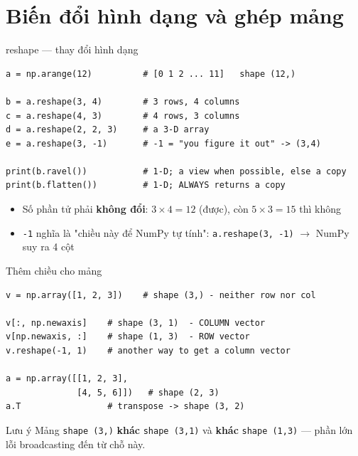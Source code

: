 \documentclass[11pt]{beamer}
\begin{document}
\section{Biến đổi hình dạng và ghép mảng}

\begin{frame}[fragile]{reshape --- thay đổi hình dạng}
\begin{lstlisting}
a = np.arange(12)          # [0 1 2 ... 11]   shape (12,)

b = a.reshape(3, 4)        # 3 rows, 4 columns
c = a.reshape(4, 3)        # 4 rows, 3 columns
d = a.reshape(2, 2, 3)     # a 3-D array
e = a.reshape(3, -1)       # -1 = "you figure it out" -> (3,4)

print(b.ravel())           # 1-D; a view when possible, else a copy
print(b.flatten())         # 1-D; ALWAYS returns a copy
\end{lstlisting}
\begin{itemize}
  \item Số phần tử phải \textbf{không đổi}: $3 \times 4 = 12$ (được), còn $5 \times 3 = 15$ thì không
  \item \texttt{-1} nghĩa là "chiều này để NumPy tự tính": \texttt{a.reshape(3, -1)} $\to$ NumPy suy ra 4 cột
\end{itemize}
\end{frame}

\begin{frame}[fragile]{Thêm chiều cho mảng}
\begin{lstlisting}
v = np.array([1, 2, 3])    # shape (3,) - neither row nor col

v[:, np.newaxis]    # shape (3, 1)  - COLUMN vector
v[np.newaxis, :]    # shape (1, 3)  - ROW vector
v.reshape(-1, 1)    # another way to get a column vector

a = np.array([[1, 2, 3],
              [4, 5, 6]])   # shape (2, 3)
a.T                 # transpose -> shape (3, 2)
\end{lstlisting}
\begin{block}{Lưu ý}
Mảng \texttt{shape (3,)} \textbf{khác} \texttt{shape (3,1)} và \textbf{khác} \texttt{shape (1,3)} --- phần lớn lỗi broadcasting đến từ chỗ này.
\end{block}
\end{frame}
\end{document}
